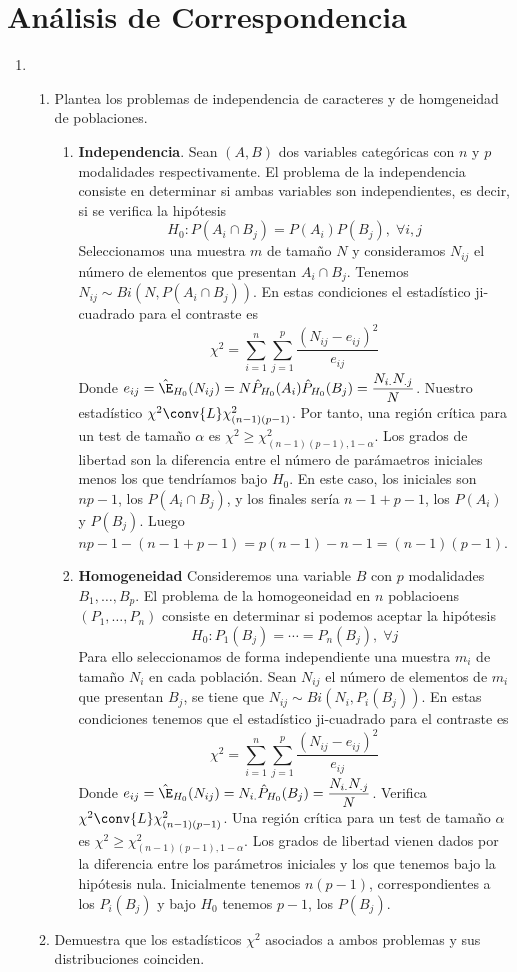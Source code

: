 \documentclass[twoside]{article}
\begin{document}
\section{Análisis de Correspondencia}
\begin{enumerate}
\item 
\begin{enumerate}
\item Plantea los problemas de independencia de caracteres y de homgeneidad de poblaciones.

\begin{enumerate}
\item[] \textbf{Independencia}. Sean $(A,B)$ dos variables categóricas con $n$ y $p$ modalidades respectivamente. El problema de la independencia consiste en determinar si ambas variables son independientes, es decir, si se verifica la hipótesis
$$
H_0\colon P(A_i\cap B_j) = P(A_i)P(B_j), \; \forall i,j
$$
Seleccionamos una muestra $m$ de tamaño $N$ y consideramos $N_{ij}$ el número de elementos que presentan $A_i\cap B_j$. Tenemos $N_{ij}\sim Bi(N,P(A_i\cap B_j))$. En estas condiciones  el estadístico ji-cuadrado para el contraste es
$$
\chi^2 = \sum_{i=1}^n \sum_{j=1}^p \frac{(N_{ij}-e_{ij})^2}{e_{ij}}
$$
Donde $e_{ij} = \hat{\E}_{H_0}(N_{ij}) = N\hat{P}_{H_0}(A_i)\hat{P}_{H_0}(B_j) = \dfrac{N_{i.}N_{.j}}{N}$. Nuestro estadístico $\chi^2 \conv{L}\chi^2_{(n-1)(p-1)}$. Por tanto, una región crítica para un test de tamaño $\alpha$ es $\chi^2 \geq \chi^2_{(n-1)(p-1),1-\alpha}$. Los grados de libertad son la diferencia entre el número de parámaetros iniciales menos los que tendríamos bajo $H_0$. En este caso, los iniciales son $np-1$, los $P(A_i\cap B_j)$, y los finales sería $n-1 + p -1$, los $P(A_i)$ y $P(B_j)$. Luego $np-1 - (n-1+p-1) = p(n - 1) -n -1 = (n-1)(p-1)$.
\item[] \textbf{Homogeneidad} Consideremos una variable $B$ con $p$ modalidades $B_1,\dotsc,B_p$. El problema de la homogeoneidad en $n$ poblacioens $(P_1,\dotsc,P_n)$ consiste en determinar si podemos aceptar la hipótesis
$$
H_0\colon P_1(B_j) = \cdots = P_n(B_j),\;\forall j
$$
Para ello seleccionamos de forma independiente una muestra $m_i$ de tamaño $N_i$ en cada población. Sean $N_{ij}$ el número de elementos de $m_i$ que presentan $B_j$, se tiene que $N_{ij}\sim Bi(N_i,P_i(B_j))$. En estas condiciones tenemos que el estadístico ji-cuadrado para el contraste es
$$
\chi^2 = \sum_{i=1}^n \sum_{j=1}^p \frac{(N_{ij}-e_{ij})^2}{e_{ij}}
$$
Donde $e_{ij} = \hat{\E}_{H_0}(N_{ij}) = N_{i.}\hat{P}_{H_0}(B_j) = \dfrac{N_{i.}N_{.j}}{N}$. Verifica $\chi^2 \conv{L}\chi^2_{(n-1)(p-1)}$. Una región crítica para un test de tamaño $\alpha$ es $\chi^2 \geq \chi^2_{(n-1)(p-1),1-\alpha}$. Los grados de libertad vienen dados por la diferencia entre los parámetros iniciales y los que tenemos bajo la hipótesis nula. Inicialmente tenemos $n(p-1)$, correspondientes a los $P_i(B_j)$ y bajo $H_0$ tenemos $p-1$, los $P(B_j)$. 
\end{enumerate}
\item Demuestra que los estadísticos $\chi^2$ asociados a ambos problemas y sus distribuciones coinciden.


\end{enumerate}
\end{enumerate}
\end{document}
